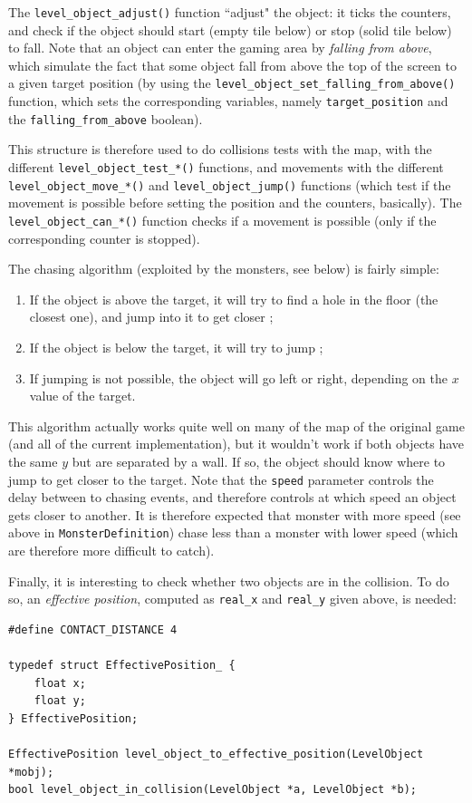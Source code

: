 \documentclass[12pt,a4paper]{article}
\newcommand{\cc}[1]{\texttt{#1}}
\begin{document}
The \cc{level_object_adjust()} function ``adjust" the object: it ticks the counters, and check if the object should start (empty tile below) or stop (solid tile below) to fall. Note that an object can enter the gaming area by \textit{falling from above}, which simulate the fact that some object fall from above the top of the screen to a given target position (by using the \cc{level_object_set_falling_from_above()} function, which sets the corresponding variables, namely \cc{target_position} and the \cc{falling_from_above} boolean).

This structure is therefore used to do collisions tests with the map, with the different \cc{level_object_test_*()} functions, and movements with the different \cc{level_object_move_*()} and \cc{level_object_jump()} functions (which test if the movement is possible before setting the position and the counters, basically). The \cc{level_object_can_*()} function checks if a movement is possible (only if the corresponding counter is stopped).

The chasing algorithm (exploited by the monsters, see below) is fairly simple:\begin{enumerate}
\item If the object is above the target, it will try to find a hole in the floor (the closest one), and jump into it to get closer ;
\item If the object is below the target, it will try to jump ;
\item If jumping is not possible, the object will go left or right, depending on the $x$ value of the target.
\end{enumerate}
This algorithm actually works quite well on many of the map of the original game (and all of the current implementation), but it wouldn't work if both objects have the same $y$ but are separated by a wall. If so, the object should know where to jump to get closer to the target. Note that the \cc{speed} parameter controls the delay between to chasing events, and therefore controls at which speed an object gets closer to another. It is therefore expected that monster with more speed (see above in \cc{MonsterDefinition}) chase less than a monster with lower speed (which are therefore more difficult to catch).

Finally, it is interesting to check whether two objects are in the collision. To do so, an \textit{effective position}, computed as \cc{real_x} and \cc{real_y} given above, is needed:
\begin{verbatim}
#define CONTACT_DISTANCE 4

typedef struct EffectivePosition_ {
	float x;
	float y;
} EffectivePosition;

EffectivePosition level_object_to_effective_position(LevelObject *mobj);
bool level_object_in_collision(LevelObject *a, LevelObject *b);
\end{verbatim}
\end{document}
